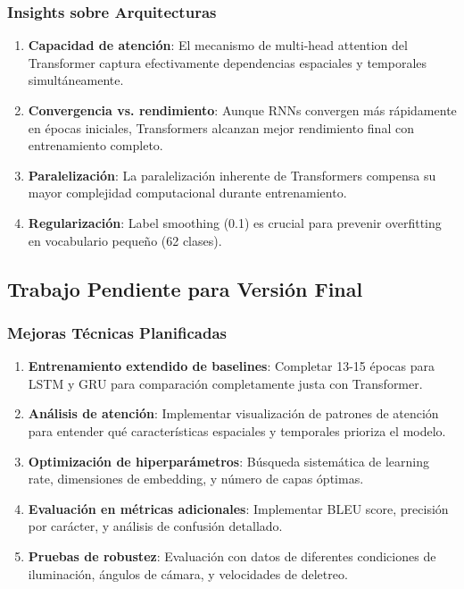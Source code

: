 \documentclass[12pt,a4paper]{article}
\begin{document}
\subsubsection{Insights sobre Arquitecturas}

\begin{enumerate}
    \item \textbf{Capacidad de atención}: El mecanismo de multi-head attention del Transformer captura efectivamente dependencias espaciales y temporales simultáneamente.

    \item \textbf{Convergencia vs. rendimiento}: Aunque RNNs convergen más rápidamente en épocas iniciales, Transformers alcanzan mejor rendimiento final con entrenamiento completo.

    \item \textbf{Paralelización}: La paralelización inherente de Transformers compensa su mayor complejidad computacional durante entrenamiento.

    \item \textbf{Regularización}: Label smoothing (0.1) es crucial para prevenir overfitting en vocabulario pequeño (62 clases).
\end{enumerate}

\subsection{Trabajo Pendiente para Versión Final}

\subsubsection{Mejoras Técnicas Planificadas}

\begin{enumerate}
    \item \textbf{Entrenamiento extendido de baselines}: Completar 13-15 épocas para LSTM y GRU para comparación completamente justa con Transformer.

    \item \textbf{Análisis de atención}: Implementar visualización de patrones de atención para entender qué características espaciales y temporales prioriza el modelo.

    \item \textbf{Optimización de hiperparámetros}: Búsqueda sistemática de learning rate, dimensiones de embedding, y número de capas óptimas.

    \item \textbf{Evaluación en métricas adicionales}: Implementar BLEU score, precisión por carácter, y análisis de confusión detallado.

    \item \textbf{Pruebas de robustez}: Evaluación con datos de diferentes condiciones de iluminación, ángulos de cámara, y velocidades de deletreo.
\end{enumerate}
\end{document}
